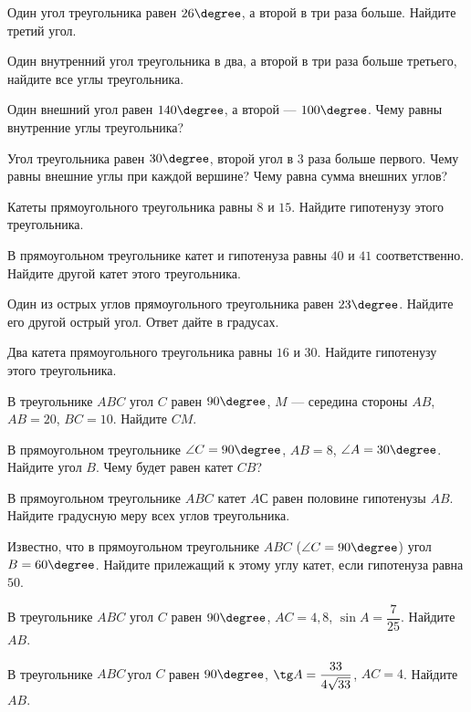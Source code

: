 \begin{class}[number=11]
	\begin{listofex}
		\item Один угол треугольника равен \( 26\degree \), а второй в три раза больше. Найдите третий угол.
		\item Один внутренний угол треугольника в два, а второй в три раза больше третьего, найдите все углы треугольника.
		\item Один внешний угол равен \( 140\degree \), а второй --- \( 100\degree \). Чему равны внутренние углы треугольника?
		\item Угол треугольника равен \( 30\degree \), второй угол в \( 3 \) раза больше первого. Чему равны внешние углы при каждой вершине? Чему равна сумма внешних углов?
		\item Катеты прямоугольного треугольника равны \( 8 \) и \( 15 \). Найдите гипотенузу этого треугольника.
		\item В прямоугольном треугольнике катет и гипотенуза равны \( 40 \) и \( 41 \) соответственно. Найдите другой катет этого треугольника.
		\item Один из острых углов прямоугольного треугольника равен \( 23\degree \). Найдите его другой острый угол. Ответ дайте в градусах.
		\item Два катета прямоугольного треугольника равны \( 16 \) и \( 30 \). Найдите гипотенузу этого треугольника.
		\item В треугольнике \( ABC \) угол \( C \) равен \( 90\degree \), \( M \) --- середина стороны \( AB \), \( AB=20 \), \( BC=10 \). Найдите \( CM \).
		\item В прямоугольном треугольнике \( \angle C=90\degree \), \( AB=8 \), \( \angle A=30\degree \). Найдите угол \( B \). Чему будет равен катет \( CB \)?
		\item В прямоугольном треугольнике \( ABC \) катет \( AС \) равен половине гипотенузы \( AB \). Найдите градусную меру всех углов треугольника.
		\item Известно, что в прямоугольном треугольнике \( ABC \) (\( \angle C=90\degree \)) угол \( B=60\degree \). Найдите прилежащий к этому углу катет, если гипотенуза равна \( 50 \).
		\item В треугольнике \( ABC \) угол \( C \) равен \( 90\degree \), \( AC = 4,8 \),  \( \sin A = \dfrac{7}{25} \).  Найдите \( AB \).
		\item В треугольнике \( ABC \) угол \( C \) равен \( 90\degree \),  \( \tg A = \dfrac{33}{4\sqrt{33}} \),  \( AC =  4 \). Найдите \( AB \).

\end{listofex}
\end{class}
